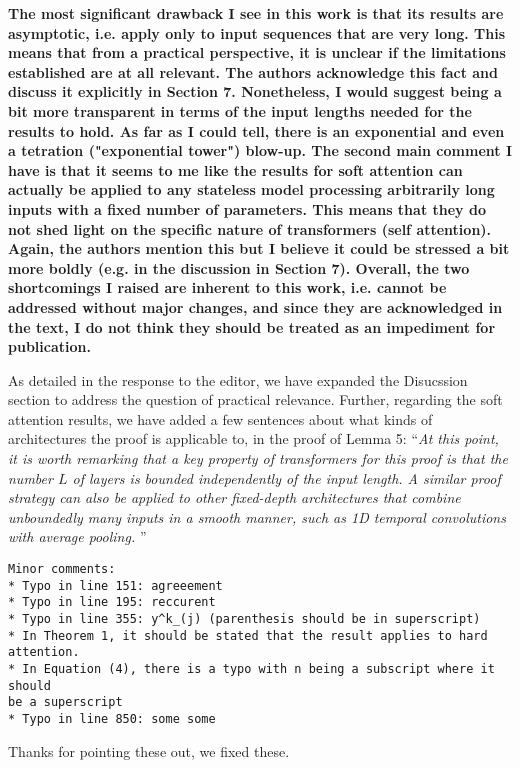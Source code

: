 \documentclass[11pt,a4paper]{article}
\newcommand\response[1]{{\color{blue}#1}}
\newcommand\newtext[1]{``\textit{#1}''}
\newcommand\original[1]{\textbf{#1}}
\begin{document}
\original{The most significant drawback I see in this work is that its results are
asymptotic, i.e. apply only to input sequences that are very long.  This
means that from a practical perspective, it is unclear if the limitations
established are at all relevant.  The authors acknowledge this fact and
discuss it explicitly in Section 7.  Nonetheless, I would suggest being a
bit more transparent in terms of the input lengths needed for the results to
hold.  As far as I could tell, there is an exponential and even a tetration
("exponential tower") blow-up.  The second main comment I have is that it
seems to me like the results for soft attention can actually be applied to
any stateless model processing arbitrarily long inputs with a fixed number
of parameters.  This means that they do not shed light on the specific
nature of transformers (self attention).  Again, the authors mention this
but I believe it could be stressed a bit more boldly (e.g. in the discussion
in Section 7).  Overall, the two shortcomings I raised are inherent to this
work, i.e. cannot be addressed without major changes, and since they are
acknowledged in the text, I do not think they should be treated as an
impediment for publication.}

\response{As detailed in the response to the editor, we have expanded the Disucssion section to address the question of practical relevance. Further, regarding the soft attention results, we have added a few sentences about what kinds of architectures the proof is applicable to, in the proof of Lemma 5: \newtext{At this point, it is worth remarking that a key property of transformers for this proof is that the number $L$ of layers is bounded independently of the input length.
A similar proof strategy can also be applied to other fixed-depth architectures that combine unboundedly many inputs in a smooth manner, such as 1D temporal convolutions with average pooling.
}}

\begin{verbatim}
Minor comments:
* Typo in line 151: agreeement
* Typo in line 195: reccurent
* Typo in line 355: y^k_(j) (parenthesis should be in superscript)
* In Theorem 1, it should be stated that the result applies to hard
attention.
* In Equation (4), there is a typo with n being a subscript where it should
be a superscript
* Typo in line 850: some some
\end{verbatim}

\response{Thanks for pointing these out, we fixed these.}
\end{document}
